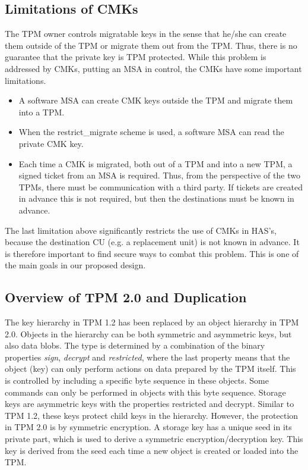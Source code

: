 {\subsection{Limitations of CMKs}
The TPM owner controls migratable keys in the sense that he/she can create them outside of the TPM or migrate them out from the TPM. Thus, there is no guarantee that the private key is TPM protected. While this problem is addressed by CMKs, putting an MSA in control, the CMKs have some important limitations.
\begin{itemize}
\item A software MSA can create CMK keys outside the TPM and migrate them into a TPM.
\item When the restrict\_migrate scheme is used, a software MSA can read the private CMK key.
\item Each time a CMK is migrated, both out of a TPM and into a new TPM, a signed ticket from an MSA is required. Thus, from the perspective of the two TPMs, there must be communication with a third party. If tickets are created in advance this is not required, but then the destinations must be known in advance.
\end{itemize}
 
The last limitation above significantly restricts the use of CMKs in HAS's, because the destination CU (e.g. a replacement unit) is not known in advance. It is therefore important to find secure ways to combat this problem. This is one of the main goals in our proposed design.
 
\subsection{Overview of TPM 2.0 and Duplication}
The key hierarchy in TPM 1.2 has been replaced by an object hierarchy in TPM 2.0. Objects in the hierarchy can be both symmetric and asymmetric keys, but also data blobs. The type is determined by a combination of the binary properties \textit{sign}, \textit{decrypt} and \textit{restricted}, where the last property means that the object (key) can only perform actions on data prepared by the TPM itself. This is controlled by including a specific byte sequence in these objects. Some commands can only be performed in objects with this byte sequence. Storage keys are asymmetric keys with the properties restricted and decrypt. Similar to TPM 1.2, these keys protect child keys in the hierarchy. However, the protection in TPM 2.0 is by symmetric encryption. A storage key has a unique seed in its private part, which is used to derive a symmetric encryption/decryption key. This key is derived from the seed each time a new object is created or loaded into the TPM.
 
}
